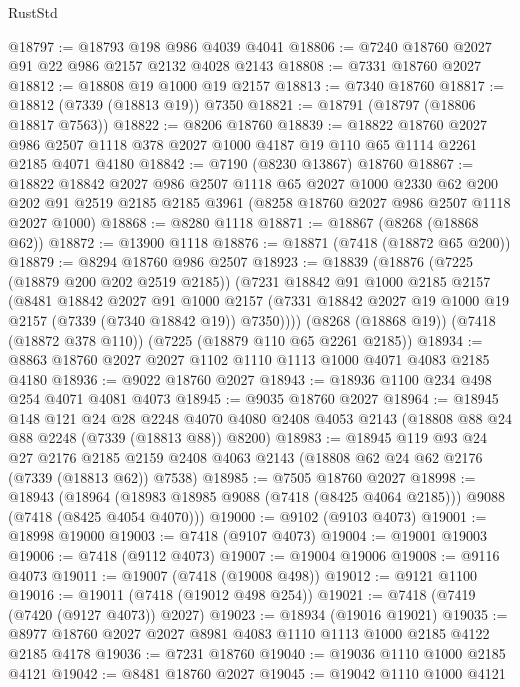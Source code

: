 \begin{lexlean}{RustStd}
\begin{coremodule}
@18797 := @18793 @198 @986 @4039 @4041
@18806 := @7240 @18760 @2027 @91 @22 @986 @2157 @2132 @4028 @2143
@18808 := @7331 @18760 @2027
@18812 := @18808 @19 @1000 @19 @2157
@18813 := @7340 @18760
@18817 := @18812 (@7339 (@18813 @19)) @7350
@18821 := @18791 (@18797 (@18806 @18817 @7563))
@18822 := @8206 @18760
@18839 := @18822
    @18760
    @2027
    @986
    @2507
    @1118
    @378
    @2027
    @1000
    @4187
    @19
    @110
    @65
    @1114
    @2261
    @2185
    @4071
    @4180
@18842 := @7190 (@8230 @13867) @18760
@18867 := @18822
    @18842
    @2027
    @986
    @2507
    @1118
    @65
    @2027
    @1000
    @2330
    @62
    @200
    @202
    @91
    @2519
    @2185
    @2185
    @3961
    (@8258 @18760 @2027 @986 @2507 @1118 @2027 @1000)
@18868 := @8280 @1118
@18871 := @18867 (@8268 (@18868 @62))
@18872 := @13900 @1118
@18876 := @18871 (@7418 (@18872 @65 @200))
@18879 := @8294 @18760 @986 @2507
@18923 := @18839
    (@18876
      (@7225 (@18879 @200 @202 @2519 @2185))
      (@7231
        @18842
        @91
        @1000
        @2185
        @2157
        (@8481
          @18842
          @2027
          @91
          @1000
          @2157
          (@7331 @18842 @2027 @19 @1000 @19 @2157 (@7339 (@7340 @18842 @19)) @7350))))
    (@8268 (@18868 @19))
    (@7418 (@18872 @378 @110))
    (@7225 (@18879 @110 @65 @2261 @2185))
@18934 := @8863 @18760 @2027 @2027 @1102 @1110 @1113 @1000 @4071 @4083 @2185 @4180
@18936 := @9022 @18760 @2027
@18943 := @18936 @1100 @234 @498 @254 @4071 @4081 @4073
@18945 := @9035 @18760 @2027
@18964 := @18945
    @148
    @121
    @24
    @28
    @2248
    @4070
    @4080
    @2408
    @4053
    @2143
    (@18808 @88 @24 @88 @2248 (@7339 (@18813 @88)) @8200)
@18983 := @18945
    @119
    @93
    @24
    @27
    @2176
    @2185
    @2159
    @2408
    @4063
    @2143
    (@18808 @62 @24 @62 @2176 (@7339 (@18813 @62)) @7538)
@18985 := @7505 @18760 @2027
@18998 := @18943
    (@18964 (@18983 @18985 @9088 (@7418 (@8425 @4064 @2185))) @9088 (@7418 (@8425 @4054 @4070)))
@19000 := @9102 (@9103 @4073)
@19001 := @18998 @19000
@19003 := @7418 (@9107 @4073)
@19004 := @19001 @19003
@19006 := @7418 (@9112 @4073)
@19007 := @19004 @19006
@19008 := @9116 @4073
@19011 := @19007 (@7418 (@19008 @498))
@19012 := @9121 @1100
@19016 := @19011 (@7418 (@19012 @498 @254))
@19021 := @7418 (@7419 (@7420 (@9127 @4073)) @2027)
@19023 := @18934 (@19016 @19021)
@19035 := @8977 @18760 @2027 @2027 @8981 @4083 @1110 @1113 @1000 @2185 @4122 @2185 @4178
@19036 := @7231 @18760
@19040 := @19036 @1110 @1000 @2185 @4121
@19042 := @8481 @18760 @2027
@19045 := @19042 @1110 @1000 @4121

\end{coremodule}
\end{lexlean}
